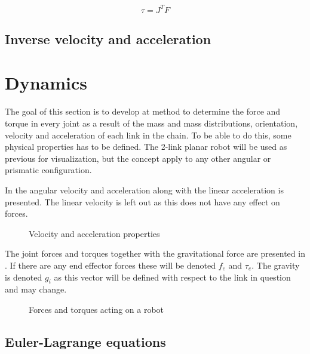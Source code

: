 
\begin{equation}\label{Jtorque}
\tau = J^T F
\end{equation}

\subsection{Inverse velocity and acceleration}
\section{Dynamics}

The goal of this section is to develop at method to determine the force and torque in every joint as a result of the mass and mass distributions, orientation, velocity and acceleration of each link in the chain. To be able to do this, some physical properties has to be defined. The 2-link planar robot will be used as previous for visualization, but the concept apply to any other angular or prismatic configuration.

In  the angular velocity and acceleration along with the linear acceleration is presented. The linear velocity is left out as this does not have any effect on forces.

\begin{figure}[h!]    
    \centering           
    \def\svgwidth{\columnwidth}
    
    \caption{Velocity and acceleration properties}
    \label{speed}
\end{figure}

The joint forces and torques together with the gravitational force are presented in . If there are any end effector forces these will be denoted $f_e$ and $\tau_e$. The gravity is denoted $g_i$ as this vector will be defined with respect to the link in question and may change.

\begin{figure}[h!]    
    \centering           
    \def\svgwidth{\columnwidth}
    
    \caption{Forces and torques acting on a robot}
    \label{forces}
\end{figure}



\subsection{Euler-Lagrange equations}

